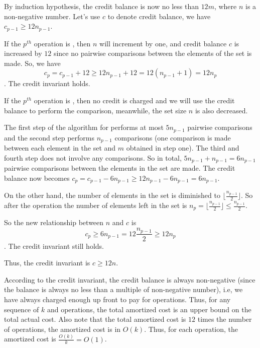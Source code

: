 \documentclass[11pt, answers]{exam}
\theoremstyle{plain}
\theoremstyle{definition}
\begin{document}
\begin{questions}
\begin{solution}
By induction hypothesis, the credit balance is now no less than $12m$, where $n$ is a non-negative number. Let's use $c$ to denote credit balance, we have $c_{p-1} \ge 12n_{p-1}$.

If the $p^{th}$ operation is , then $n$ will increment by one, and credit balance $c$ is increased by $12$ since no pairwise comparisons between the elements of the set is made. So, we have $$c_p = c_{p-1} + 12 \ge 12n_{p-1} + 12 = 12(n_{p-1}+1) = 12n_p$$. The credit invariant holds.

If the $p^{th}$ operation is , then no credit is charged and we will use the credit balance to perform the comparison, meanwhile, the set size $n$ is also decreased.

The first step of the algorithm for  performs at most $5n_{p-1}$ pairwise comparisons and the second step performs $n_{p-1}$ comparisons (one comparison is made between each element in the set and $m$ obtained in step one). The third and fourth step does not involve any comparisons. So in total, $5n_{p-1}+n_{p-1}=6n_{p-1}$ pairwise comparisons between the elements in the set are made. The credit balance now becomes $c_p=c_{p-1}-6n_{p-1} \ge 12n_{p-1} - 6n_{p-1} = 6n_{p-1}$. 

On the other hand, the number of elements in the set is diminished to $\lfloor \frac{n_{p-1}}{2} \rfloor$. So after the operation the number of elements left in the set is $n_p = \lfloor \frac{n_{p-1}}{2} \rfloor \le \frac{n_{p-1}}{2}$.

So the new relationship between $n$ and $c$ is $$c_p \ge 6n_{p-1} = 12\frac{n_{p-1}}{2} \ge 12 n_p$$. The credit invariant still holds.

Thus, the credit invariant is $c \ge 12n$.

According to the credit invariant, the credit balance is always non-negative (since the balance is always no less than a multiple of non-negative number), i.e, we have always charged enough up front to pay for  operations. Thus, for any sequence of $k$  and  operations, the total amortized cost is an upper bound on the total actual cost. Also note that the total amortized cost is $12$ times the number of  operations, the amortized cost is in $O(k)$. Thus, for each operation, the amortized cost is $\frac{O(k)}{k} = O(1)$.


\end{solution}

\end{questions}
\end{document}
